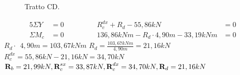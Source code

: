 \documentclass[a4paper,12pt, oneside]{book}
\begin{document}
    \begin{figure}[H]
    	\centering
    	\hspace*{-1.6cm}
    	\caption{Tratto CD.}
    	\label{fig:reazionevincolareCD}
    \end{figure}

    \begin{alignat*}{5}
    	\Sigma Y\phantom{_b}   & {}=0{} & \phantom{123456} & R_{c}^{dx}+R_d-55,86kN & {}=0{}\\
    	\Sigma M_c & {}=0{} & \phantom{123456} & 136,86kNm-R_d\cdot4,90m-33,19kNm& {}=0{} 
    \end{alignat*}
    \leavevmode\newline
    \leavevmode\newline
    $R_d\cdot\phantom{,}4,90m=103,67kNm$
    \leavevmode\newline
    \leavevmode\newline
    $R_d=\frac{103,67kNm}{4,90m}=21,16kN$
    \leavevmode\newline
    \leavevmode\newline
    $R_{c}^{dx}=55,86kN-21,16kN=34,70kN$
    \leavevmode\newline
    \leavevmode\newline
    \leavevmode\newline
    \leavevmode\newline
    \leavevmode\newline
    $\textbf{R}_b=21,99kN,\leavevmode\newline\leavevmode\newline \textbf{R}_{c}^{sx}=33,87kN,\leavevmode\newline\leavevmode\newline \textbf{R}_{c}^{dx}=34,70kN,\leavevmode\newline\leavevmode\newline \textbf{R}_d=21,16kN\leavevmode\newline$
    
\end{document}
